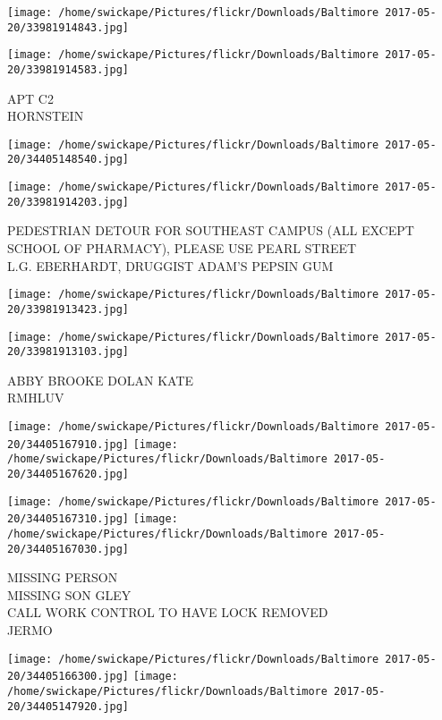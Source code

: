\documentclass[10pt,letterpaper]{article}
\begin{document}
\texttt{[image: /home/swickape/Pictures/flickr/Downloads/Baltimore 2017-05-20/33981914843.jpg]}

\vspace{0.25in}
\texttt{[image: /home/swickape/Pictures/flickr/Downloads/Baltimore 2017-05-20/33981914583.jpg]}

APT C2\\
HORNSTEIN
\pagebreak

\texttt{[image: /home/swickape/Pictures/flickr/Downloads/Baltimore 2017-05-20/34405148540.jpg]}

\vspace{0.25in}
\texttt{[image: /home/swickape/Pictures/flickr/Downloads/Baltimore 2017-05-20/33981914203.jpg]}

PEDESTRIAN DETOUR FOR SOUTHEAST CAMPUS (ALL EXCEPT SCHOOL OF PHARMACY), PLEASE USE PEARL STREET\\
L.G. EBERHARDT, DRUGGIST ADAM'S PEPSIN GUM
\pagebreak

\texttt{[image: /home/swickape/Pictures/flickr/Downloads/Baltimore 2017-05-20/33981913423.jpg]}

\vspace{0.25in}
\texttt{[image: /home/swickape/Pictures/flickr/Downloads/Baltimore 2017-05-20/33981913103.jpg]}

ABBY BROOKE DOLAN KATE\\
RMHLUV
\pagebreak

\texttt{[image: /home/swickape/Pictures/flickr/Downloads/Baltimore 2017-05-20/34405167910.jpg]}
\texttt{[image: /home/swickape/Pictures/flickr/Downloads/Baltimore 2017-05-20/34405167620.jpg]}

\texttt{[image: /home/swickape/Pictures/flickr/Downloads/Baltimore 2017-05-20/34405167310.jpg]}
\texttt{[image: /home/swickape/Pictures/flickr/Downloads/Baltimore 2017-05-20/34405167030.jpg]}

MISSING PERSON\\
MISSING SON GLEY\\
CALL WORK CONTROL TO HAVE LOCK REMOVED\\
JERMO
\pagebreak

\texttt{[image: /home/swickape/Pictures/flickr/Downloads/Baltimore 2017-05-20/34405166300.jpg]}
\texttt{[image: /home/swickape/Pictures/flickr/Downloads/Baltimore 2017-05-20/34405147920.jpg]}
\end{document}
